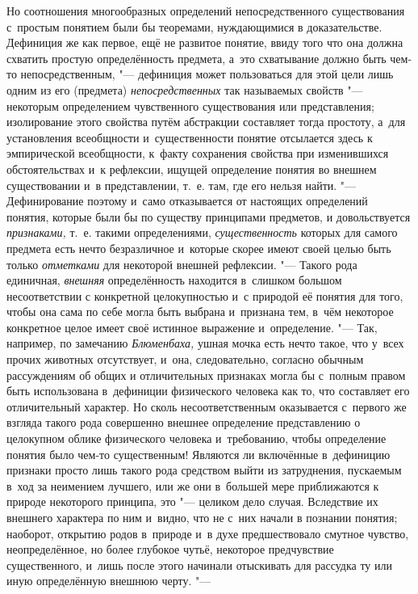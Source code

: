 Но соотношения многообразных определений непосредственного
существования с~простым понятием были бы теоремами, нуждающимися в
доказательстве. Дефиниция же как первое, ещё не развитое понятие, ввиду
того что она должна схватить простую определённость предмета, а~это
схватывание должно быть чем-то непосредственным, "--- дефиниция
может пользоваться для этой цели лишь одним из его (предмета)
{\em непосредственных}
так называемых свойств "--- некоторым
определением чувственного существования или представления; изолирование
этого свойства путём абстракции составляет тогда простоту, а~для
установления всеобщности и~существенности понятие отсылается здесь к
эмпирической всеобщности, к~факту сохранения свойства при изменившихся
обстоятельствах и~к рефлексии, ищущей определение понятия во внешнем
существовании и~в представлении, т.~е. там, где его нельзя найти. "---
Дефинирование поэтому и~само отказывается от настоящих
определений понятия, которые были бы по существу принципами предметов, и
довольствуется {\em признаками,}
т.~е. такими определениями,
{\em существенность}
которых для самого предмета есть нечто безразличное и~которые
скорее имеют своей целью быть только
{\em отметками} для
некоторой внешней рефлексии. "--- Такого рода единичная,
{\em внешняя}
определённость находится в~слишком большом несоответствии с
конкретной целокупностью и~с природой её понятия для того, чтобы она сама
по себе могла быть выбрана и~признана тем, в~чём некоторое конкретное целое
имеет своё истинное выражение и~определение. "--- Так,
например, по замечанию
{\em Блюменбаха,} ушная
мочка есть нечто такое, что у~всех прочих животных отсутствует, и~она,
следовательно, согласно обычным рассуждениям об общих и
отличительных признаках могла бы с~полным правом быть
использована в~дефиниции физического человека как то, что составляет его
отличительный характер. Но сколь несоответственным оказывается с~первого же
взгляда такого рода совершенно внешнее определение представлению о
целокупном облике физического человека и~требованию, чтобы определение
понятия было чем-то существенным! Являются ли включённые в~дефиницию
признаки просто лишь такого рода средством выйти из затруднения, пускаемым
в~ход за неимением лучшего, или же они в~большей мере приближаются к
природе некоторого принципа, это "--- целиком дело случая.
Вследствие их внешнего характера по ним и~видно, что не с~них начали в
познании понятия; наоборот, открытию родов в~природе и~в духе
предшествовало смутное чувство, неопределённое, но более глубокое чутьё,
некоторое предчувствие существенного, и~лишь после этого начинали
отыскивать для рассудка ту или иную определённую внешнюю черту. "---
